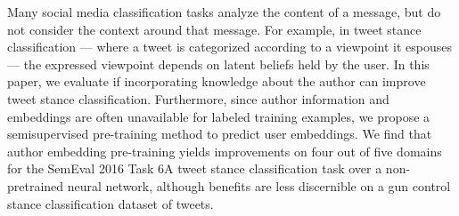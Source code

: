 Many social media classification tasks analyze the content of a message, but do not consider the context around that message. For example, in tweet stance classification --- where a tweet is categorized according to a viewpoint it espouses --- the expressed viewpoint depends on latent beliefs held by the user. In this paper, we evaluate if incorporating knowledge about the author can improve tweet stance classification.  Furthermore, since author information and embeddings are often unavailable for labeled training examples, we propose a semisupervised pre-training method to predict user embeddings. We find that author embedding pre-training yields improvements on four out of five domains for the SemEval 2016 Task 6A tweet stance classification task over a non-pretrained neural network, although benefits are less discernible on a gun control stance classification dataset of tweets.
